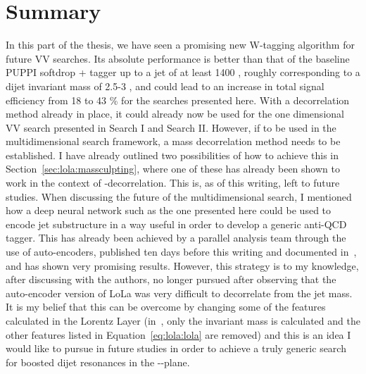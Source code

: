 \clearpage
%
\chapter{Summary}
\label{sec:lola:outlook}
In this part of the thesis, we have seen a promising new W-tagging algorithm for future VV searches. Its absolute performance is better than that of the baseline PUPPI softdrop + \nsubj tagger up to a jet \PT of at least 1400 \GeV, roughly corresponding to a dijet invariant mass of 2.5-3 \TeV, and could lead to an increase in total signal efficiency from 18 to 43 \% for the searches presented here. With a \PT decorrelation method already in place, it could already now be used for the one dimensional VV search presented in Search I and Search II. However, if to be used in the multidimensional search framework, a mass decorrelation method needs to be established. I have already outlined two possibilities of how to achieve this in Section~\ref{sec:lola:massculpting}, where one of these has already been shown to work in the context of \PT-decorrelation. This is, as of this writing, left to future studies.
\newline
\newline
When discussing the future of the multidimensional search, I mentioned how a deep neural network such as the one presented here could be used to encode jet substructure in a way useful in order to develop a generic anti-QCD tagger. This has already been achieved by a parallel analysis team through the use of auto-encoders, published ten days before this writing and documented in~\cite{Heimel:2018mkt}, and has shown very promising results. However, this strategy is to my knowledge, after discussing with the authors, no longer pursued after observing that the auto-encoder version of LoLa was very difficult to decorrelate from the jet mass. It is my belief that this can be overcome by changing some of the features calculated in the Lorentz Layer (in~\cite{Heimel:2018mkt}, only the invariant mass is calculated and the other features listed in Equation~\ref{eq:lola:lola} are removed) and this is an idea I would like to pursue in future studies in order to achieve a truly generic search for boosted dijet resonances in the \MJO-\MJT-\MVV plane.